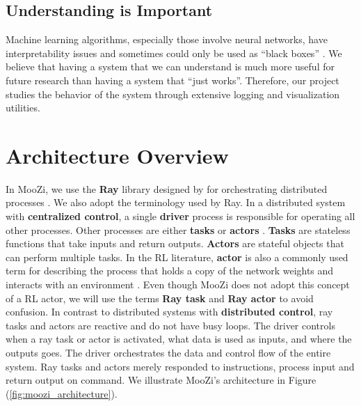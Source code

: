 \subsection{Understanding is Important}
Machine learning algorithms, especially those involve neural networks, have interpretability issues and sometimes could only be used as ``black boxes'' \cite{ExplainableAIReview_Linardatos.Papastefanopoulos.ea_2021}.
We believe that having a system that we can understand is much more useful for future research than having a system that ``just works''.
Therefore, our project studies the behavior of the system through extensive logging and visualization utilities.

\section{Architecture Overview}
In MooZi, we use the \textbf{Ray} library designed by \citeauthor{RayDistributedFramework_Moritz.Nishihara.ea_2018}
for orchestrating distributed processes \cite{RayDistributedFramework_Moritz.Nishihara.ea_2018}.
We also adopt the terminology used by Ray.
In a distributed system with \textbf{centralized control}, a single \textbf{driver} process is responsible for operating all other processes.
Other processes are either \textbf{tasks} or \textbf{actors} .
\textbf{Tasks} are stateless functions that take inputs and return outputs.
\textbf{Actors} are stateful objects that can perform multiple tasks.
In the RL literature, \textbf{actor} is also a commonly used term for describing the process that holds a copy of the network weights and interacts with an environment \cite{SEEDRLScalable_Espeholt.Marinier.ea_2020, IMPALAScalableDistributed_Espeholt.Soyer.ea_2018}.
Even though MooZi does not adopt this concept of a RL actor, we will use the terms \textbf{Ray task} and \textbf{Ray actor} to avoid confusion.
In contrast to distributed systems with \textbf{distributed control}, ray tasks and actors are reactive and do not have busy loops.
The driver controls when a ray task or actor is activated, what data is used as inputs, and where the outputs goes.
The driver orchestrates the data and control flow of the entire system.
Ray tasks and actors merely responded to instructions, process input and return output on command.
We illustrate MooZi's architecture in Figure (\ref{fig:moozi_architecture}).

